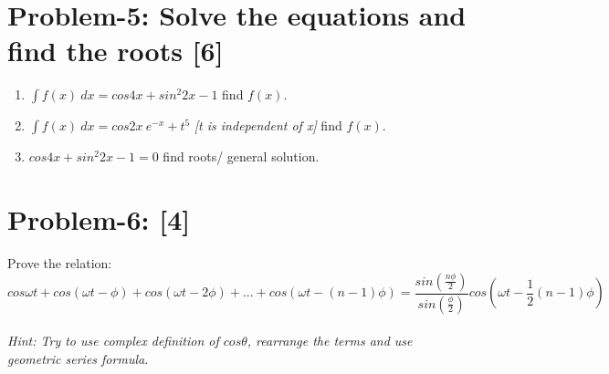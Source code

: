 \documentclass[12pt, a4paper]{article}
\begin{document}
\section*{Problem-5: Solve the equations and find the roots \hfill \textbf{[6]}}
\begin{enumerate}
    \item $\int f(x)\ dx = cos4x + sin^{2}2x -1$ find $f(x)$.
    \item $\int f(x)\ dx = cos2x\ e^{-x} + t^5$ \textit{[t is independent of x]} find $f(x)$.
    \item $cos4x + sin^{2}2x-1 = 0$ find roots/ general solution.
\end{enumerate}
\section*{Problem-6:  \hfill \textbf{[4]}}
Prove the relation:
\begin{equation*}
    cos\omega t  + cos(\omega t- \phi) + cos(\omega t- 2\phi) +...+ cos(\omega t- (n-1)\phi) = 
    \frac{sin(\frac{n\phi}{2})}{sin(\frac{\phi}{2})}cos(\omega t -\frac{1}{2}(n-1)\phi)
\end{equation*}\\
\textit{Hint: Try to use complex definition of $cos\theta$, rearrange the terms and use geometric series formula}.
\end{document}
